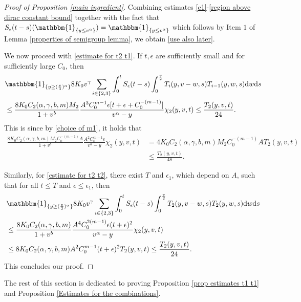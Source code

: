 \documentclass[11pt]{article}
\numberwithin{equation}{section}
\newcommand{\der}{\textup{d}}
\begin{document}
\begin{proof}[Proof of Proposition \ref{main ingredient}]
Combining estimates \eqref{e1}-\eqref{region above dirac constant bound} together with the fact that $S_{\epsilon}(t-s)(\mathbbm{1}_{\{y\leq v^{\alpha}\}})=\mathbbm{1}_{\{y\leq v^{\alpha}\}}$ which follows by Item $1$ of Lemma 
\ref{properties of semigroup lemma}, we obtain \eqref{use also later}.


We now proceed with \eqref{estimate for t2 t1}. If $t,\epsilon$ are sufficiently small and for sufficiently large $C_{0}$, then
\begin{align*}
  & \mathbbm{1}_{\{y\geq (\frac{v}{3})^{\alpha}\}} 8K_{0}     v^{\gamma} \sum_{i\in \{2,3\}}\int_{0}^{t}S_{\epsilon}(t-s)\int_{0}^{\frac{v}{2}} T_{i}(y,v-w,s)T_{i-1}(y,w,s)\der w\der s\\
      &  \leq \frac{8K_{0} C_{2}(\alpha,\gamma,b,m)M_{2}}{1+v^{b}}\frac{A^{3}C_{0}^{m-1} \epsilon[t+\epsilon+C_{0}^{-(m-1)}] }{v^{\alpha}-y}\chi_{2}(y,v,t) \leq \frac{T_{2}(y,v,t)}{24}.
\end{align*}
This is since by \eqref{choice of m1}, it holds that
\begin{align}\label{most important c0 dependence}
    \frac{8K_{0} C_{2}(\alpha,\gamma,b,m) M_{2} C_{0}^{-(m-1)} A}{1+v^{b}}\frac{A^{2}C_{0}^{m-1} \epsilon }{v^{\alpha}-y}\chi_{2}(y,v,t)  &= 4K_{0} C_{2}(\alpha,\gamma,b,m) M_{2} C_{0}^{-(m-1)} AT_{2}(y,v,t)\nonumber\\
    &\leq \frac{T_{2}(y,v,t)}{48}.
\end{align}

Similarly, for \eqref{estimate for t2 t2}, there exist $T$ and $\epsilon_{1}$, which depend on $A$, such that for all $t\leq T$ and $\epsilon\leq \epsilon_{1}$, then
\begin{align*}
  & \mathbbm{1}_{\{y\geq (\frac{v}{3})^{\alpha}\}}  8K_{0} v^{\gamma} \sum_{i\in \{2,3\}}\int_{0}^{t}S_{\epsilon}(t-s)\int_{0}^{\frac{v}{2}} T_{2}(y,v-w,s)T_{2}(y,w,s)\der w\der s\\
  &\leq \frac{8K_{0}C_{2}(\alpha,\gamma,b,m)}{1+v^{b}}\frac{A^{4}C_{0}^{2(m-1)} \epsilon(t+\epsilon)^{2} }{v^{\alpha}-y}\chi_{2}(y,v,t)\\
      &  \leq 8K_{0}C_{2}(\alpha,\gamma,b,m)A^{2}C_{0}^{m-1} (t+\epsilon)^{2} T_{2}(y,v,t)\leq \frac{T_{2}(y,v,t)}{24}.
\end{align*}
This concludes our proof.
\end{proof}





The rest of this section is dedicated to proving Proposition \ref{prop estimates t1 t1} and Proposition \ref{Estimates for the combinations}.
\end{document}
